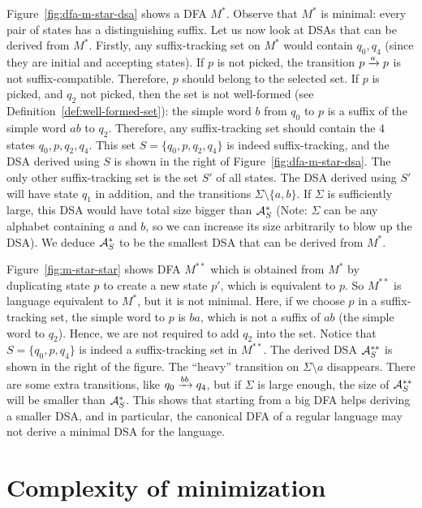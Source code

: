 Figure~\ref{fig:dfa-m-star-dsa} shows a DFA $M^*$. Observe that $M^*$
is minimal: every pair of states has a distinguishing suffix. Let us
now look at DSAs that can be derived from $M^*$. Firstly, any
suffix-tracking set on $M^*$ would contain $q_0, q_4$ (since they are
initial and accepting states). If $p$ is not picked, the transition
$p \xrightarrow{a} p$ is not suffix-compatible. Therefore, $p$ should belong
to the selected set. If $p$ is picked, and $q_2$ not picked, then the
set is not well-formed (see Definition~\ref{def:well-formed-set}): the
simple word $b$ from $q_0$ to $p$ is a suffix of the simple word $ab$
to $q_2$. Therefore, any suffix-tracking set should contain the $4$
states $q_0, p, q_2, q_4$. This set $S = \{q_0, p, q_2, q_4\}$ is
indeed suffix-tracking, and the DSA derived using $S$ is shown in the
right of Figure~\ref{fig:dfa-m-star-dsa}. The only other
suffix-tracking set is the set $S'$ of all states. The DSA derived
using $S'$ will have state $q_1$ in addition, and the transitions
$\Sigma \setminus \{a, b\}$. If $\Sigma$ is sufficiently large, this
DSA would have total size bigger than $\mathcal{A}^*_S$ (Note: $\Sigma$ can be any alphabet containing $a$ and $b$, so we can increase its size arbitrarily to blow up the DSA). We deduce $\mathcal{A}^*_S$
to be the smallest DSA that can be derived from $M^*$.

Figure~\ref{fig:m-star-star} shows DFA $M^{**}$ which is obtained from
$M^*$ by duplicating state $p$ to create a new state $p'$, which is
equivalent to $p$. So $M^{**}$ is language equivalent to $M^*$, but it
is not minimal. Here, if we choose $p$ in a suffix-tracking set, the
simple word to $p$ is $ba$, which is not a suffix of $ab$ (the simple
word to $q_2$). Hence, we are not required to add $q_2$ into the
set. Notice that $S = \{q_0, p, q_4\}$ is indeed a suffix-tracking set
in $M^{**}$. The derived DSA $\mathcal{A}^{**}_S$ is shown in the right of the
figure. The ``heavy'' transition on $\Sigma \setminus a$
disappears. There are some extra transitions, like $q_0 \xrightarrow{bb} q_4$,
but if $\Sigma$ is large enough, the size of $\mathcal{A}^{**}_S$ will be
smaller than $\mathcal{A}^*_S$. This shows that starting from a big DFA helps
deriving a smaller DSA, and in particular, the canonical DFA of a
regular language may not derive a minimal DSA for the language.



\section{Complexity of minimization}
\label{sec:complexity}

